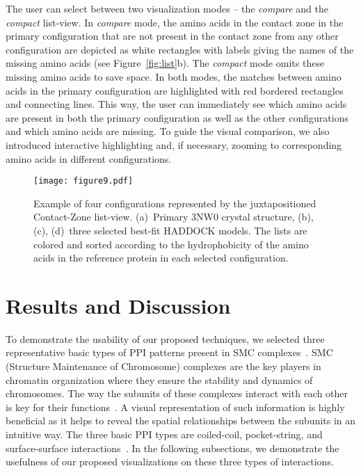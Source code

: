 \documentclass[twocolumn]{bmcart}%
\def\CoZoListView {Contact-Zone list-view\xspace}
\begin{document}
The user can select between two visualization modes -- the \textit{compare} and the \textit{compact} list-view.
In \textit{compare} mode, the amino acids in the contact zone in the primary configuration that are not present in the contact zone from any other configuration are depicted as white rectangles with labels giving the names of the missing amino acids (see Figure~\ref{fig:list}b).
The \textit{compact} mode omits these missing amino acids to save space.
In both modes, the matches between amino acids in the primary configuration are highlighted with red bordered rectangles and connecting lines.
This way, the user can immediately see which amino acids are present in both the primary configuration as well as the other configurations and which amino acids are missing.
To guide the visual comparison, we also introduced interactive highlighting and, if necessary, zooming to corresponding amino acids in different configurations.

\begin{figure*}[tb]
    \centering
    \texttt{[image: figure9.pdf]}
    \vspace{-5pt}
    \caption{ Example of four configurations represented by the juxtapositioned \CoZoListView. (a)~Primary 3NW0 crystal structure, (b), (c), (d)~three selected best-fit HADDOCK models. The lists are colored and sorted according to the hydrophobicity of the amino acids in the reference protein in each selected configuration.}
  \label{fig:case3}
\end{figure*}

\section*{Results and Discussion}
To demonstrate the usability of our proposed techniques, we selected three representative basic types of PPI patterns present in SMC complexes~\cite{Palecek2015}. 
SMC (Structure Maintenance of Chromosome) complexes are the key players in chromatin organization where they ensure the stability and dynamics of chromosomes. The way the subunits of these complexes interact with each other is key for their functions~\cite{Gligoris}.
A visual representation of such information is highly beneficial as it helps to reveal the spatial relationships between the subunits in an intuitive way.
The three basic PPI types are coiled-coil, pocket-string, and surface-surface interactions~\cite{alberts02molecular}.
In the following subsections, we demonstrate the usefulness of our proposed visualizations on these three types of interactions.
\end{document}
